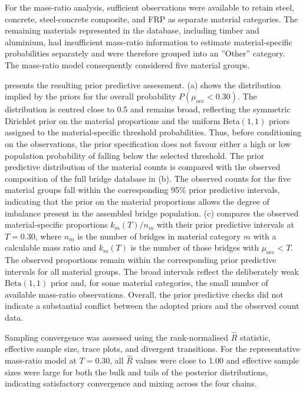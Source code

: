 \documentclass[preprint,a4paper,12pt]{elsarticle}
\begin{document}
For the mass-ratio analysis, sufficient observations were available to retain steel, concrete, steel-concrete composite, and FRP as separate material categories. 
The remaining materials represented in the database, including timber and aluminium, had insufficient mass-ratio information to estimate material-specific probabilities separately and were therefore grouped into an ''Other'' category. 
The mass-ratio model consequently considered five material groups.

 presents the resulting prior predictive assessment. 
(a) shows the distribution implied by the priors for the overall probability $P(\mu_{\mathrm{occ}}<0.30)$. 
The distribution is centred close to 0.5 and remains broad, reflecting the symmetric Dirichlet prior on the material proportions and the uniform $\mathrm{Beta}(1,1)$ priors assigned to the material-specific threshold probabilities. 
Thus, before conditioning on the observations, the prior specification does not favour either a high or low population probability of falling below the selected threshold.
The prior predictive distribution of the material counts is compared with the observed composition of the full bridge database in (b). 
The observed counts for the five material groups fall within the corresponding 95\% prior predictive intervals, indicating that the prior on the material proportions allows the degree of imbalance present in the assembled bridge population.
(c) compares the observed material-specific proportions $k_m(T)/n_m$ with their prior predictive intervals at $T=0.30$, where $n_m$ is the number of bridges in material category $m$ with a calculable mass ratio and $k_m(T)$ is the number of those bridges with $\mu_{\mathrm{occ}}<T$. 
The observed proportions remain within the corresponding prior predictive intervals for all material groups.
The broad intervals reflect the deliberately weak $\mathrm{Beta}(1,1)$ prior and, for some material categories, the small number of available mass-ratio observations. 
Overall, the prior predictive checks did not indicate a substantial conflict between the adopted priors and the observed count data.

Sampling convergence was assessed using the rank-normalised $\hat{R}$ statistic, effective sample size, trace plots, and divergent
transitions. 
For the representative mass-ratio model at $T=0.30$, all $\hat{R}$ values were close to 1.00 and effective sample sizes were large for both the bulk and tails of the posterior distributions, indicating satisfactory convergence and mixing across the four chains.
\end{document}
